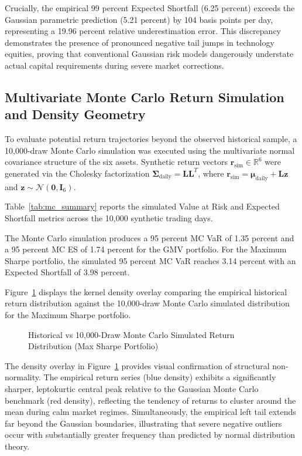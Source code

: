Crucially, the empirical 99 percent Expected Shortfall (6.25 percent) exceeds the Gaussian parametric prediction (5.21 percent) by 104 basis points per day, representing a 19.96 percent relative underestimation error. This discrepancy demonstrates the presence of pronounced negative tail jumps in technology equities, proving that conventional Gaussian risk models dangerously understate actual capital requirements during severe market corrections.

\subsection{Multivariate Monte Carlo Return Simulation and Density Geometry}

To evaluate potential return trajectories beyond the observed historical sample, a 10,000-draw Monte Carlo simulation was executed using the multivariate normal covariance structure of the six assets. Synthetic return vectors $\mathbf{r}_{\text{sim}} \in \mathbb{R}^6$ were generated via the Cholesky factorization $\boldsymbol{\Sigma}_{\text{daily}} = \mathbf{L} \mathbf{L}^T$, where $\mathbf{r}_{\text{sim}} = \boldsymbol{\mu}_{\text{daily}} + \mathbf{L} \mathbf{z}$ and $\mathbf{z} \sim \mathcal{N}(\mathbf{0}, \mathbf{I}_6)$.

Table~\ref{tab:mc_summary} reports the simulated Value at Risk and Expected Shortfall metrics across the 10,000 synthetic trading days.



The Monte Carlo simulation produces a 95 percent MC VaR of 1.35 percent and a 95 percent MC ES of 1.74 percent for the GMV portfolio. For the Maximum Sharpe portfolio, the simulated 95 percent MC VaR reaches 3.14 percent with an Expected Shortfall of 3.98 percent.

Figure~\ref{fig:mc_distribution} displays the kernel density overlay comparing the empirical historical return distribution against the 10,000-draw Monte Carlo simulated distribution for the Maximum Sharpe portfolio.

\begin{figure}[H]
  \centering
  \caption{Historical vs 10,000-Draw Monte Carlo Simulated Return Distribution (Max Sharpe Portfolio)}
  \label{fig:mc_distribution}
\end{figure}

The density overlay in Figure~\ref{fig:mc_distribution} provides visual confirmation of structural non-normality. The empirical return series (blue density) exhibits a significantly sharper, leptokurtic central peak relative to the Gaussian Monte Carlo benchmark (red density), reflecting the tendency of returns to cluster around the mean during calm market regimes. Simultaneously, the empirical left tail extends far beyond the Gaussian boundaries, illustrating that severe negative outliers occur with substantially greater frequency than predicted by normal distribution theory.

